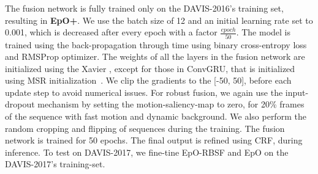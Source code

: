 \documentclass[10pt,twocolumn,letterpaper]{article}
\begin{document}
The fusion network is fully trained only on the DAVIS-2016's training set, resulting in \textbf{EpO+}.
We use the batch size of 12 and an initial learning rate set to 0.001, which is decreased after every epoch with a factor \(\frac{epoch}{50}\). 
The model is trained using the back-propagation through time \cite{backpropagationThrougTime} using binary cross-entropy loss and RMSProp optimizer. 
The weights of all the layers in the fusion network are initialized using the Xavier \cite{xavier}, except for those in ConvGRU, that is initialized using MSR initialization~\cite{MSR}. We clip the gradients to the [-50, 50], before each update step \cite{graves2013generating} to avoid numerical issues. 
For robust fusion, we again use the input-dropout mechanism by setting the motion-saliency-map to zero, for 20\% frames of the sequence with fast motion and dynamic background. We also perform the random cropping and flipping of sequences during the training. The fusion network is trained for 50 epochs. The final output is refined using CRF, during inference. 
To test on DAVIS-2017, we fine-tine EpO-RBSF and EpO on the DAVIS-2017's training-set.

\vspace{0.125cm}
\end{document}
